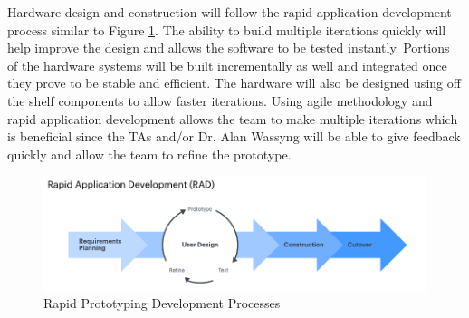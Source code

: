 \documentclass[11pt]{article}
\begin{document}
Hardware design and construction will follow the rapid application development process similar to Figure \ref{fig:rapid}. The ability to build multiple iterations quickly will help improve the design and allows the software to be tested instantly. Portions of the hardware systems will be built incrementally as well and integrated once they prove to be stable and efficient. The hardware will also be designed using off the shelf components to allow faster iterations. Using agile methodology and rapid application development allows the team to make multiple iterations which is beneficial since the TAs and/or Dr. Alan Wassyng will be able to give feedback quickly and allow the team to refine the prototype. 




\begin{figure}
	\centering
	\includegraphics[width=.8\textwidth]{img/rad.png}
	\caption[]{Rapid Prototyping Development Processes}
	\label{fig:rapid}
\end{figure}
\end{document}
